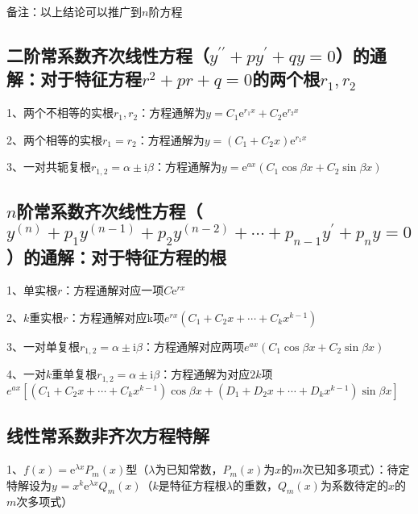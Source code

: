 备注：以上结论可以推广到$n$阶方程



\subsection{二阶常系数齐次线性方程（$y^{\prime \prime}+p y^{\prime}+q y=0$）的通解：对于特征方程$r^{2}+p r+q=0$的两个根$ r_{1}, r_{2} $}

1、两个不相等的实根$r_{1}, r_{2}$：方程通解为$ y=C_{1} \mathrm{e}^{r_1 x}+C_{2} \mathrm{e}^{r_2 x}$

2、两个相等的实根$r_{1}=r_{2}$：方程通解为$y=\left(C_{1}+C_{2} x\right) \mathrm{e}^{r_1 x}$

3、一对共轭复根$r_{1,2}=\alpha \pm \mathrm{i} \beta$：方程通解为$y=\mathrm{e}^{a x}\left(C_{1} \cos \beta x+C_{2} \sin \beta x\right)$



\subsection{$n$阶常系数齐次线性方程（$y^{(n)}+p_{1} y^{(n-1)}+p_{2} y^{(n-2)}+\cdots+p_{n-1} y^{\prime}+p_{n} y=0$）的通解：对于特征方程的根}

1、单实根$r$：方程通解对应一项$ C \mathrm{e}^{rx}$

2、$k$重实根$r$：方程通解对应k项${e}^{r x}\left(C_{1}+C_{2} x+\cdots+C_{k} x^{k-1}\right)$

3、一对单复根$r_{1,2}=\alpha \pm \mathrm{i} \beta$：方程通解对应两项${e}^{a x}\left(C_{1} \cos \beta x+C_{2} \sin \beta x\right)$

4、一对$k$重单复根$r_{1,2}=\alpha \pm \mathrm{i} \beta$：方程通解为对应$2k$项${e}^{{ax}}[(C_{1}+C_{2} x+\cdots+C_{k} x^{k-1}) \cos \beta x+(D_{1}+D_{2} x+\cdots+D_{k} x^{k-1}) \sin \beta x]$



\subsection{线性常系数非齐次方程特解}

1、$f(x)=\mathrm{e}^{\lambda x} P_{m}(x)$型（$\lambda$为已知常数，$P_{m}(x)$为$x$的$m$次已知多项式）：待定特解设为$y^{}=x^{k} \mathrm{e}^{\lambda x} Q_{m}(x)$（$k$是特征方程根$\lambda$的重数，$Q_{m}(x)$为系数待定的$x$的$m$次多项式）

